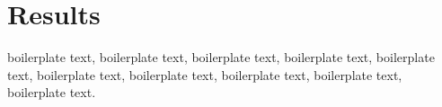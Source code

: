 \chapter{Results}


boilerplate text, boilerplate text, boilerplate text, boilerplate text, boilerplate text, boilerplate text, boilerplate text, boilerplate text, boilerplate text, boilerplate text.


